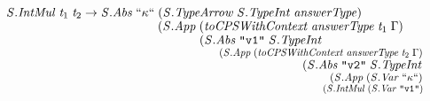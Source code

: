 \documentclass[10pt]{article}
\newcommand{\Conid}[1]{\mathit{#1}}
\newcommand{\Varid}[1]{\mathit{#1}}
\begin{document}
\begin{hscode}
${\hskip1.00em\relax\hskip1.00em\relax\Conid{\Conid{S}.IntMul}\;\Varid{t}_{1}\;\Varid{t}_{2}\to \Conid{\Conid{S}.Abs}\;\text{``}\kappa\text{``}\;(\Conid{\Conid{S}.TypeArrow}\;\Conid{\Conid{S}.TypeInt}\;\Varid{answerType})\;}$\\
${\hskip1.00em\relax\hskip1.00em\relax\phantom{\Conid{\Conid{S}.IntMul}\;\Varid{t}_{1}\;\Varid{t}_{2}\to \Conid{\Conid{S}.Abs}\;\text{``}\kappa\text{``}\;\mbox{}}(\Conid{\Conid{S}.App}\;(\Varid{toCPSWithContext}\;\Varid{answerType}\;\Varid{t}_{1}\;\Gamma)\;}$\\
${\hskip1.00em\relax\hskip1.00em\relax\phantom{\Conid{\Conid{S}.IntMul}\;\Varid{t}_{1}\;\Varid{t}_{2}\to \Conid{\Conid{S}.Abs}\;\text{``}\kappa\text{``}\;\mbox{}}\phantom{(\Conid{\Conid{S}.App}\;\mbox{}}(\Conid{\Conid{S}.Abs}\;\text{\tt \char34 v1\char34}\;\Conid{\Conid{S}.TypeInt}\;}$\\
${\hskip1.00em\relax\hskip1.00em\relax\phantom{\Conid{\Conid{S}.IntMul}\;\Varid{t}_{1}\;\Varid{t}_{2}\to \Conid{\Conid{S}.Abs}\;\text{``}\kappa\text{``}\;\mbox{}}\phantom{(\Conid{\Conid{S}.App}\;\mbox{}}\phantom{(\Conid{\Conid{S}.Abs}\;\text{\tt \char34 v1\char34}\;\mbox{}}(\Conid{\Conid{S}.App}\;(\Varid{toCPSWithContext}\;\Varid{answerType}\;\Varid{t}_{2}\;\Gamma)\;}$\\
${\hskip1.00em\relax\hskip1.00em\relax\phantom{\Conid{\Conid{S}.IntMul}\;\Varid{t}_{1}\;\Varid{t}_{2}\to \Conid{\Conid{S}.Abs}\;\text{``}\kappa\text{``}\;\mbox{}}\phantom{(\Conid{\Conid{S}.App}\;\mbox{}}\phantom{(\Conid{\Conid{S}.Abs}\;\text{\tt \char34 v1\char34}\;\mbox{}}\phantom{(\Conid{\Conid{S}.App}\;\mbox{}}(\Conid{\Conid{S}.Abs}\;\text{\tt \char34 v2\char34}\;\Conid{\Conid{S}.TypeInt}\;}$\\
${\hskip1.00em\relax\hskip1.00em\relax\phantom{\Conid{\Conid{S}.IntMul}\;\Varid{t}_{1}\;\Varid{t}_{2}\to \Conid{\Conid{S}.Abs}\;\text{``}\kappa\text{``}\;\mbox{}}\phantom{(\Conid{\Conid{S}.App}\;\mbox{}}\phantom{(\Conid{\Conid{S}.Abs}\;\text{\tt \char34 v1\char34}\;\mbox{}}\phantom{(\Conid{\Conid{S}.App}\;\mbox{}}\phantom{(\Conid{\Conid{S}.Abs}\;\text{\tt \char34 v2\char34}\;\mbox{}}(\Conid{\Conid{S}.App}\;(\Conid{\Conid{S}.Var}\;\text{``}\kappa\text{``})\;}$\\
${\hskip1.00em\relax\hskip1.00em\relax\phantom{\Conid{\Conid{S}.IntMul}\;\Varid{t}_{1}\;\Varid{t}_{2}\to \Conid{\Conid{S}.Abs}\;\text{``}\kappa\text{``}\;\mbox{}}\phantom{(\Conid{\Conid{S}.App}\;\mbox{}}\phantom{(\Conid{\Conid{S}.Abs}\;\text{\tt \char34 v1\char34}\;\mbox{}}\phantom{(\Conid{\Conid{S}.App}\;\mbox{}}\phantom{(\Conid{\Conid{S}.Abs}\;\text{\tt \char34 v2\char34}\;\mbox{}}\phantom{(\Conid{\Conid{S}.App}\;\mbox{}}(\Conid{\Conid{S}.IntMul}\;(\Conid{\Conid{S}.Var}\;\text{\tt \char34 v1\char34})\;}$\\

\end{hscode}
\end{document}
